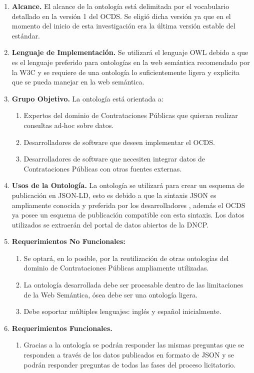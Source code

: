 \begin{enumerate}
\item \textbf{Alcance.} El alcance de la ontología está delimitada por el vocabulario detallado en la versión 1 del OCDS. Se eligió dicha versión ya que en el momento del inicio de esta investigación era la última versión estable del estándar.
\item \textbf{Lenguaje de Implementación.} Se utilizará el lenguaje OWL debido a que es el lenguaje preferido para ontologías en la web semántica recomendado por la W3C \cite{OWLSeman72:online} y se requiere de una ontología lo suficientemente ligera y explícita que se pueda manejar en la web semántica.
\item \textbf{Grupo Objetivo. }La ontología está orientada a:
\begin{enumerate}
    \item Expertos del dominio de Contrataciones Públicas que quieran realizar consultas ad-hoc sobre datos.
    \item Desarrolladores de software que deseen implementar el OCDS.
    \item Desarrolladores de software que necesiten integrar datos de Contrataciones Públicas con otras fuentes externas. \end{enumerate}
\item \textbf{Usos de la Ontología.} La ontología se utilizará para crear un esquema de publicación en JSON-LD, esto es debido a que la sintaxis JSON es ampliamente conocida y preferida por los desarrolladores \cite{JSONLDSy39:online}, además el OCDS ya posee un esquema de publicación compatible con esta sintaxis. Los datos utilizados se extraerán del portal de datos abiertos de la DNCP.
\item \textbf{Requerimientos No Funcionales: }
\begin{enumerate}
    \item Se optará, en lo posible, por la reutilización de otras ontologías del dominio de Contrataciones Públicas ampliamente utilizadas.
    \item La ontología desarrollada debe ser procesable dentro de las limitaciones de la Web Semántica, ósea debe ser una ontología ligera.
    \item Debe soportar múltiples lenguajes: inglés y español inicialmente.
\end{enumerate}
\item \textbf{Requerimientos Funcionales. }
    \begin{enumerate}
        \item Gracias a la ontología se podrán responder las mismas preguntas que se responden a través de los datos publicados en formato de JSON y se podrán responder preguntas de todas las fases del proceso licitatorio.

\end{enumerate}
\end{enumerate}
